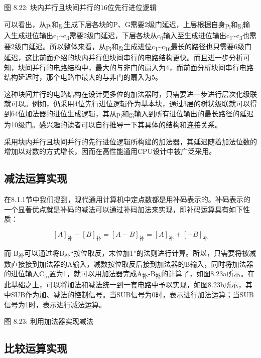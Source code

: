 \documentclass[]{ctexbook}
\begin{document}
图 8.22: 块内并行且块间并行的16位先行进位逻辑

可以看出，从p\textsubscript{i}和g\textsubscript{i}生成下层各块的P、G需要2级门延迟，上层根据自身p\textsubscript{i}和g\textsubscript{i}输入生成进位输出c\textsubscript{1}\textasciitilde c\textsubscript{3}需要2级门延迟，下层各块从c\textsubscript{0}输入至生成进位输出c\textsubscript{1}\textasciitilde c\textsubscript{3}也需要2级门延迟。所以整体来看，从p\textsubscript{i}和g\textsubscript{i}生成进位c\textsubscript{1}\textasciitilde c\textsubscript{16}最长的路径也只需要6级门延迟，这比前面介绍的块内并行但块间串行的电路结构更快。而且进一步分析可知，块间并行的电路结构中，最大的与非门的扇入为4，而前面分析块间串行电路结构延迟时，那个电路中最大的与非门的扇入为5。

这种块间并行的电路结构在设计更多位的加法器时，只需要进一步进行层次化级联就可以。例如，仍采用4位先行进位逻辑作为基本块，通过3层的树状级联就可以得到64位加法器的进位生成逻辑，其从p\textsubscript{i}和g\textsubscript{i}输入到所有进位输出的最长路径的延迟为10级门。感兴趣的读者可以自行推导一下其具体的结构和连接关系。

采用块内并行且块间并行的先行进位逻辑所构建的加法器，其延迟随着加法位数的增加以对数的方式增长，因而在高性能通用CPU设计中被广泛采用。

\hypertarget{ux51cfux6cd5ux8fd0ux7b97ux5b9eux73b0}{%
\subsection{减法运算实现}\label{ux51cfux6cd5ux8fd0ux7b97ux5b9eux73b0}}

在8.1.1节中我们提到，现代通用计算机中定点数都是用补码表示的。补码表示的一个显著优点就是补码的减法可以通过补码加法来实现，即补码运算具有如下性质：

\[[A]_{\mbox{补}}-[B]_{\mbox{补}}=[A-B]_{\mbox{补}}=[A]_{\mbox{补}}+[-B]_{\mbox{补}}\]

而-B\textsubscript{补}可以通过将B\textsubscript{补}``按位取反，末位加1''的法则进行计算。所以，只需要将被减数直接接到加法器的A输入，减数按位取反后接到加法器的B输入，同时将加法器的进位输入C\textsubscript{in}置为1，就可以用加法器完成A\textsubscript{补}-B\textsubscript{补}的计算了，如图8.23a所示。在此基础之上，可以将加法和减法统一到一套电路中予以实现，如图8.23b所示，其中SUB作为加、减法的控制信号。当SUB信号为0时，表示进行加法运算；当SUB信号为1时，表示进行减法运算。

图 8.23: 利用加法器实现减法

\hypertarget{ux6bd4ux8f83ux8fd0ux7b97ux5b9eux73b0}{%
\subsection{比较运算实现}\label{ux6bd4ux8f83ux8fd0ux7b97ux5b9eux73b0}}
\end{document}
